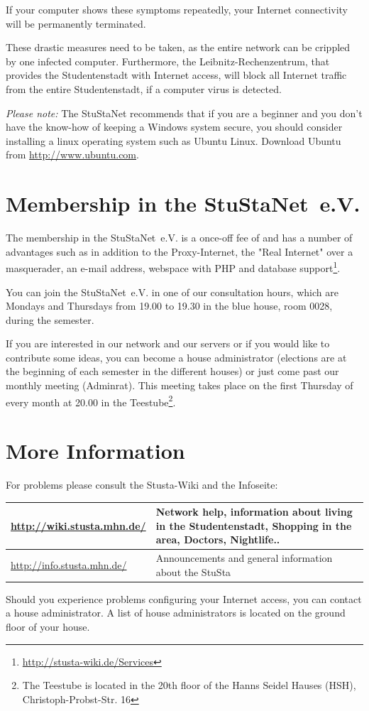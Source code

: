 \documentclass[a4paper,12pt]{scrartcl}
\begin{document}
\begin{em}
If your computer shows these symptoms repeatedly, your Internet connectivity will be permanently terminated.
\end{em}

These drastic measures need to be taken, as the entire network can be crippled by one infected computer. Furthermore, the Leibnitz-Rechenzentrum, that provides the Studentenstadt with Internet access, will block all Internet traffic from the entire Studentenstadt, if a computer virus is detected.

\emph{Please note:} The StuStaNet recommends that if you are a beginner and you don't have the know-how of keeping a Windows system secure, you should consider installing a linux operating system such as Ubuntu Linux. Download Ubuntu from \url{http://www.ubuntu.com}.


\section*{Membership in the StuStaNet~e.V.}

The membership in the StuStaNet~e.V. is a once-off fee of  and has a number of advantages such as in addition to the Proxy-Internet, the "Real Internet" over a masquerader, an e-mail address, webspace with PHP and database support\footnote{\url{http://stusta-wiki.de/Services}}.

You can join the StuStaNet~e.V. in one of our consultation hours, which are Mondays and Thursdays from 19.00 to 19.30 in the blue house, room 0028, during the semester.

If you are interested in our network and our servers or if you would like to contribute some ideas, you can become a house administrator (elections are at the beginning of each semester in the different houses) or just come past our monthly meeting (Adminrat). This meeting takes place on the first Thursday of every month at 20.00 in the Teestube\footnote{The Teestube is located in the 20th floor of the Hanns Seidel Hauses (HSH), Christoph-Probst-Str. 16}.

\section*{More Information}

For problems please consult the Stusta-Wiki and the Infoseite:

\begin{center}
  \begin{tabularx}{\linewidth}{|lX|}
    \hline
    \url{http://wiki.stusta.mhn.de/} & Network help, information about living in the Studentenstadt, Shopping in the area, Doctors, Nightlife..\\
    \hline
    \url{http://info.stusta.mhn.de/} & Announcements and general information about the StuSta\\
    \hline
  \end{tabularx}
\end{center}
Should you experience problems configuring your Internet access, you can contact a house administrator. A list of house administrators is located on the ground floor of your house.
\end{document}
